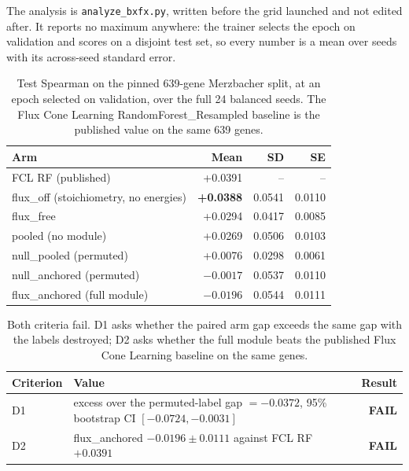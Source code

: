 The analysis is \texttt{analyze\_bxfx.py}, written before the grid launched and not edited
after. It reports no maximum anywhere: the trainer selects the epoch on validation and
scores on a disjoint test set, so every number is a mean over seeds with its across-seed
standard error.

\begin{table}[H]
  \centering
  \footnotesize
  \caption[Arm results]{Test Spearman on the pinned 639-gene Merzbacher split, at an epoch
  selected on validation, over the full 24 balanced seeds. The Flux Cone Learning
  RandomForest\_Resampled baseline is the published value on the same 639 genes.}
  \label{tab:armresults}
  \begin{tabular}{@{}lrrr@{}}
    \hline
    Arm & Mean & SD & SE \\
    \hline
    FCL RF (published) & +0.0391 & -- & -- \\
    flux\_off (stoichiometry, no energies) & \textbf{+0.0388} & 0.0541 & 0.0110 \\
    flux\_free & +0.0294 & 0.0417 & 0.0085 \\
    pooled (no module) & +0.0269 & 0.0506 & 0.0103 \\
    null\_pooled (permuted) & +0.0076 & 0.0298 & 0.0061 \\
    null\_anchored (permuted) & $-0.0017$ & 0.0537 & 0.0110 \\
    flux\_anchored (full module) & \textbf{$-0.0196$} & 0.0544 & 0.0111 \\
    \hline
  \end{tabular}
\end{table}

\begin{table}[H]
  \centering
  \footnotesize
  \caption[The prespecified decision]{Both criteria fail. D1 asks whether the paired arm gap
  exceeds the same gap with the labels destroyed; D2 asks whether the full module beats the
  published Flux Cone Learning baseline on the same genes.}
  \label{tab:decision}
  \begin{tabular}{@{}lp{}r@{}}
    \hline
    Criterion & Value & Result \\
    \hline
    D1 & excess over the permuted-label gap $=-0.0372$, 95\% bootstrap CI
      $[-0.0724, -0.0031]$ & \textbf{FAIL} \\
    D2 & flux\_anchored $-0.0196 \pm 0.0111$ against FCL RF $+0.0391$ & \textbf{FAIL} \\
    \hline
  \end{tabular}
\end{table}

